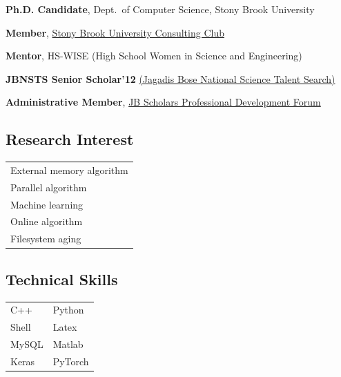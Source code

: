 \documentclass[letterpaper,10pt]{article}
\begin{document}
\begin{minipage}{0.65\textwidth}
\resumeSubHeadingListStart
\item \textbf{Ph.D. Candidate}, Dept.\ of Computer Science, Stony Brook University
\item \textbf{Member}, \href{https://sbuconsultingclub.wixsite.com/sbucc}{Stony Brook University Consulting Club} 
\item \textbf{Mentor}, HS-WISE (High School Women in Science and Engineering)
\item \textbf{JBNSTS Senior Scholar'12} \href{https://jbnsts.ac.in}{(Jagadis Bose National Science Talent Search)}
\item \textbf{Administrative Member}, \href{https://sites.google.com/view/jbspdf/home}{JB Scholars Professional Development Forum}
\resumeSubHeadingListEnd
\end{minipage}
\begin{minipage}{0.1\textwidth}
\end{minipage}
\begin{minipage}{0.25\textwidth}
\subsection*{Research Interest}
\begin{center}
\begin{tabular*}{\textwidth}{ m{5cm} }
\rowcolor{Gray} External memory algorithm \\
\rowcolor{Gray} Parallel algorithm \\
\rowcolor{Gray} Machine learning \\
\rowcolor{Gray} Online algorithm \\
\rowcolor{Gray} Filesystem aging \\
\end{tabular*}
\end{center}
\subsection*{Technical Skills}
\begin{center}
\begin{tabular*}{\textwidth}{ m{3cm} m{2cm} }
\rowcolor{Gray} C++ & Python \\
\rowcolor{Gray} Shell & Latex \\
\rowcolor{Gray} MySQL & Matlab \\
\rowcolor{Gray} Keras & PyTorch \\
\end{tabular*}
\end{center}
\end{minipage}
\end{document}
